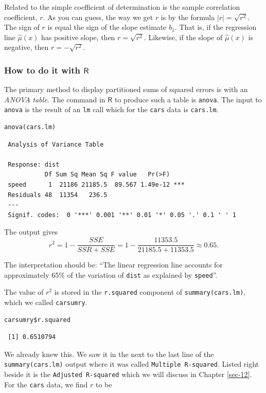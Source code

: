 \documentclass[captions=tableheading]{scrbook}
\begin{document}
Related to the simple coefficient of determination is the sample correlation coefficient, \(r\). As you can guess, the way we get \(r\) is by the formula \(|r|=\sqrt{r^{2}}\). The sign of \(r\) is equal the sign of the slope estimate \(b_{1}\). That is, if the regression line \(\hat{\mu}(x)\) has positive slope, then \(r=\sqrt{r^{2}}\). Likewise, if the slope of \(\hat{\mu}(x)\) is negative, then \(r=-\sqrt{r^{2}}\).
\subsubsection{How to do it with \(\mathsf{R}\)}
\label{sec-11-3-2-1}


The primary method to display partitioned sums of squared errors is with an \emph{ANOVA table}. The command in \(\mathsf{R}\) to produce such a table is \texttt{anova}. The input to \texttt{anova} is the result of an \texttt{lm} call which for the \texttt{cars} data is \texttt{cars.lm}.


\begin{verbatim}
anova(cars.lm)
\end{verbatim}

\begin{verbatim}
 Analysis of Variance Table
 
 Response: dist
           Df Sum Sq Mean Sq F value   Pr(>F)    
 speed      1  21186 21185.5  89.567 1.49e-12 ***
 Residuals 48  11354   236.5                     
 ---
 Signif. codes:  0 '***' 0.001 '**' 0.01 '*' 0.05 '.' 0.1 ' ' 1
\end{verbatim}

The output gives
\[
r^{2}=1-\frac{SSE}{SSR+SSE}=1-\frac{11353.5}{21185.5+11353.5}\approx0.65.
\]

The interpretation should be: ``The linear regression line accounts for approximately 65\% of the variation of \texttt{dist} as explained by \texttt{speed}''.

The value of \(r^{2}\) is stored in the \texttt{r.squared} component of \texttt{summary(cars.lm)}, which we called \texttt{carsumry}.


\begin{verbatim}
carsumry$r.squared
\end{verbatim}

\begin{verbatim}
 [1] 0.6510794
\end{verbatim}

We already knew this. We saw it in the next to the last line of the \texttt{summary(cars.lm)} output where it was called \texttt{Multiple R-squared}. Listed right beside it is the \texttt{Adjusted R-squared} which we will discuss in Chapter \ref{sec-12}.  For the \texttt{cars} data, we find \(r\) to be
\end{document}
